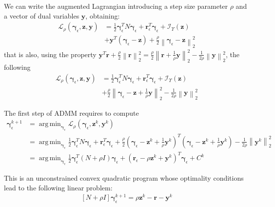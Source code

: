\documentclass[AMA,STIX1COL]{WileyNJD-v2}
\newcommand{\vect}[1]{\bm{#1}}
\newcommand{\norm}[1]{\left\lVert#1\right\rVert}
\DeclareMathOperator*{\argmin}{arg\,min} %
\begin{document}
We can write the augmented Lagrangian introducing a step size parameter $\rho$ and a vector of dual variables $\vect{y}$, obtaining:
\begin{align}
\mathcal{L}_{\rho} \left(\vect{\gamma}_\epsilon,\vect{z},\vect{y} \right) &= 
\frac{1}{2} \vect{\gamma}_\epsilon^T N \vect{\gamma}_\epsilon + \vect{r}^T_\epsilon \vect{\gamma}_\epsilon  
+  \mathcal{I}_\Upsilon(\vect{z}) \nonumber \\
&+ \vect{y}^T (\vect{\gamma}_\epsilon - \vect{z}) 
+ \frac{\rho}{2} \norm{\vect{\gamma}_\epsilon - \vect{z}}_2^2
\end{align}
that is also, using the property $\vect{y}^T\vect{r} + \frac{\rho}{2}\norm{\vect{r}}_2^2 = \frac{\rho}{2}\norm{\vect{r}+\frac{1}{\rho} \vect{y}}_2^2 - \frac{1}{2\rho} \norm{\vect{y}}_2^2$, the following
\begin{align}
\mathcal{L}_{\rho} \left(\vect{\gamma}_\epsilon,\vect{z},\vect{y} \right) &= 
\frac{1}{2} \vect{\gamma}_\epsilon^T N \vect{\gamma}_\epsilon + \vect{r}^T_\epsilon \vect{\gamma}_\epsilon  
+  \mathcal{I}_\Upsilon(\vect{z}) \nonumber \\
&+ \frac{\rho}{2} \norm{\vect{\gamma}_\epsilon - \vect{z} + \frac{1}{\rho} \vect{y}}_2^2
- \frac{1}{2\rho} \norm{\vect{y}}_2^2
\label{eq:augmentedlagrangian}
\end{align}

The first step of ADMM requires to compute 
\begin{align}
\vect{\gamma}_\epsilon^{k+1} &= \argmin_{\vect{\gamma}_\epsilon} \mathcal{L}_{\rho} \left( \vect{\gamma}_\epsilon,\vect{z}^k,\vect{y}^k \right) \\
 &= \argmin_{\vect{\gamma}_\epsilon} \frac{1}{2} \vect{\gamma}_\epsilon^T N \vect{\gamma}_\epsilon + \vect{r}^T_\epsilon \vect{\gamma}_\epsilon  
+ \frac{\rho}{2} (\vect{\gamma}_\epsilon - \vect{z}^k + \frac{1}{\rho} \vect{y}^k)^T(\vect{\gamma}_\epsilon - \vect{z}^k + \frac{1}{\rho} \vect{y}^k)
- \frac{1}{2\rho} \norm{\vect{y}^k}_2^2 \\
 &= \argmin_{\vect{\gamma}_\epsilon} \frac{1}{2} \vect{\gamma}_\epsilon^T (N+ \rho I) \vect{\gamma}_\epsilon 
   + (\vect{r}_\epsilon - \rho \vect{z}^k + \vect{y}^k)^T \vect{\gamma}_\epsilon + C^k 
\end{align}

This is an unconstrained convex quadratic program whose optimality conditions lead to the following linear problem:
\begin{align}
    \left[ N + \rho I \right] \vect{\gamma}_\epsilon^{k+1} =  \rho \vect{z}^k - \vect{r} - \vect{y}^k
		\label{eq:admm_1b}
\end{align}
\end{document}

